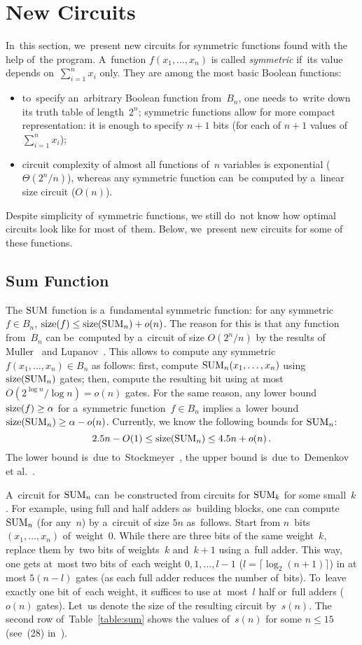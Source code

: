 \section{New Circuits}
In~this section, we~present new circuits for symmetric functions found with the help of~the program. A~function $f(x_1,\dotsc,x_n)$ is called \emph{symmetric} if~its value depends on~$\sum_{i=1}^nx_i$ only. They are among the most basic Boolean functions:
\begin{itemize}
\item to~specify an~arbitrary Boolean function
from~$B_n$, one needs
to~write down its truth table of length~$2^n$; symmetric functions allow for more compact representation: it is enough to specify $n+1$ bits (for each of $n+1$ values
of~$\sum_{i=1}^nx_i$);
\item circuit complexity of almost all functions
of~$n$ variables is exponential ($\Theta(2^n/n)$), whereas any symmetric function can~be computed by a~linear size circuit ($O(n)$).
\end{itemize}
Despite simplicity of~symmetric functions, we still do~not
know how optimal circuits look like for most of~them. Below, we~present new circuits for some of these functions.

\subsection{Sum Function}\label{section:sum}
The $\operatorname{SUM}$ function is a~fundamental symmetric function: for any symmetric $f \in B_n$, $\operatorname{size}(f)\le \operatorname{size}(\operatorname{SUM}_n)+o(n)$. The reason for this is that any function from~$B_n$ can be~computed by a~circuit of size $O(2^n/n)$ by the results of Muller~\cite{M56} and Lupanov~\cite{Lup59}. This allows to compute any symmetric $f(x_1, \dotsc, x_n) \in B_n$ as follows: first, compute $\operatorname{SUM}_n(x_1, \dotsc, x_n)$ using $\operatorname{size}(\operatorname{SUM}_n)$ gates; then, compute the resulting bit using at most $O(2^{\log n}/\log n)=o(n)$ gates. For the same reason, any lower bound $\operatorname{size}(f) \ge \alpha$ for
a~symmetric function~$f \in B_n$ implies a~lower bound $\operatorname{size}(\operatorname{SUM}_n) \ge \alpha-o(n)$. Currently, we know the following bounds for $\operatorname{SUM}_n$:
\[2.5n-O(1) \le \operatorname{size}(\operatorname{SUM}_n) \le 4.5n+o(n) \, .\]
The lower bound is~due to~Stockmeyer~\cite{DBLP:journals/mst/Stockmeyer77}, the upper bound is~due to~Demenkov et al.~\cite{DBLP:journals/ipl/DemenkovKKY10}.

A~circuit for $\operatorname{SUM}_n$ can~be constructed from circuits for $\operatorname{SUM}_k$ for some small~$k$. For example,
using full and half adders as~building blocks, one can compute $\operatorname{SUM}_n$ (for any~$n$) by a~circuit of size $5n$ as~follows. Start from $n$~bits $(x_1, \dotsc, x_n)$ of~weight~$0$. While there are three bits of the same weight~$k$, replace them by~two bits of weights~$k$ and~$k+1$ using a~full adder. This way, one gets at~most two bits of~each weight $0,1,\dotsc,l-1$ ($l=\lceil \log_2(n+1)\rceil$) in at most $5(n-l)$ gates (as each full adder reduces the number of~bits). To~leave exactly one bit
of~each weight, it suffices to use at~most~$l$ half
or~full adders ($o(n)$ gates). Let~us denote the
size of the resulting circuit by~$s(n)$. The second row
of~Table~\ref{table:sum} shows the values of~$s(n)$ for
some $n \le 15$ (see~(28) in~\cite{Knuth:2008:ACP:1377542}).


